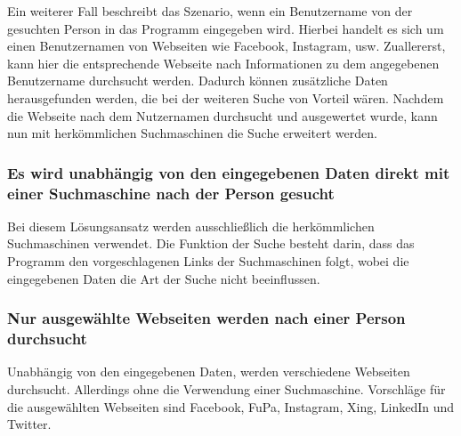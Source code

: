 		Ein weiterer Fall beschreibt das Szenario, wenn ein Benutzername von der gesuchten Person in das Programm eingegeben wird. Hierbei handelt es sich um einen Benutzernamen von Webseiten wie Facebook, Instagram, usw. Zuallererst, kann hier die entsprechende Webseite nach Informationen zu dem angegebenen Benutzername durchsucht werden. Dadurch können zusätzliche Daten herausgefunden werden, die bei der weiteren Suche von Vorteil wären.
		Nachdem die Webseite nach dem Nutzernamen durchsucht und ausgewertet wurde, kann nun mit herkömmlichen Suchmaschinen die Suche erweitert werden.
		\subsubsection{Es wird unabhängig von den eingegebenen Daten direkt mit einer Suchmaschine nach der Person gesucht}
		Bei diesem Lösungsansatz werden ausschließlich die herkömmlichen Suchmaschinen verwendet. Die Funktion der Suche besteht darin, dass das Programm den vorgeschlagenen Links der Suchmaschinen folgt, wobei die eingegebenen Daten die Art der Suche nicht beeinflussen.
		\subsubsection{Nur ausgewählte Webseiten werden nach einer Person durchsucht}
		Unabhängig von den eingegebenen Daten, werden verschiedene Webseiten durchsucht. Allerdings ohne die Verwendung einer Suchmaschine. Vorschläge für die ausgewählten Webseiten sind Facebook, FuPa, Instagram, Xing, LinkedIn und Twitter.
	
